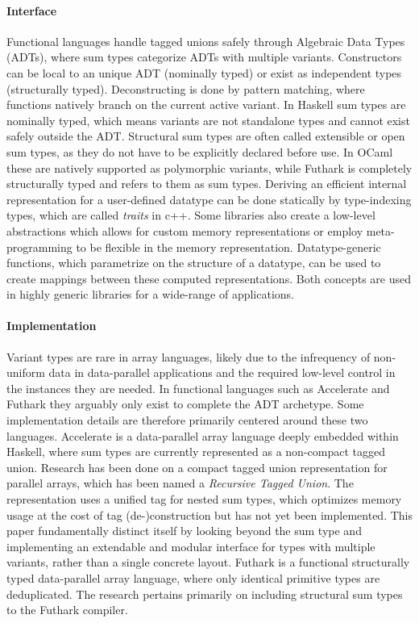 \documentclass{article}
\begin{document}
\paragraph{Interface}

Functional languages handle tagged unions safely through Algebraic Data Types (ADTs), where sum types categorize ADTs with multiple variants.
Constructors can be local to an unique ADT (nominally typed) or exist as independent types (structurally typed).
Deconstructing is done by pattern matching, where functions natively branch on the current active variant.
In Haskell sum types are nominally typed, which means variants are not standalone types and cannot exist safely outside the ADT.
Structural sum types are often called extensible or open sum types, as they do not have to be explicitly declared before use.
In OCaml these are natively supported as polymorphic variants, while Futhark is completely structurally typed and refers to them as sum types.
Deriving an efficient internal representation for a user-defined datatype can be done statically by type-indexing types\cite{associated-types}, which are called {\it traits} in c++.
Some libraries also create a low-level abstractions which allows for custom memory representations\cite{llama} or employ meta-programming to be flexible in the memory representation.
Datatype-generic functions, which parametrize on the structure of a datatype, can be used to create mappings between these computed representations.
Both concepts are used in highly generic libraries for a wide-range of applications\cite{generic-programming}. 

\paragraph{Implementation}

Variant types are rare in array languages, likely due to the infrequency of non-uniform data in data-parallel applications and the required low-level control in the instances they are needed.
In functional languages such as Accelerate and Futhark they arguably only exist to complete the ADT archetype.
Some implementation details are therefore primarily centered around these two languages.
Accelerate is a data-parallel array language deeply embedded within Haskell, where sum types are currently represented as a non-compact tagged union.
Research has been done on a compact tagged union representation for parallel arrays, which has been named a {\it Recursive Tagged Union}\cite{accelerate-sum-types}.
The representation uses a unified tag for nested sum types, which optimizes memory usage at the cost of tag (de-)construction but has not yet been implemented. 
This paper fundamentally distinct itself by looking beyond the sum type and implementing an extendable and modular interface for types with multiple variants, rather than a single concrete layout. 
Futhark is a functional structurally typed data-parallel array language, where only identical primitive types are deduplicated.
The research pertains primarily on including structural sum types to the Futhark compiler\cite{futhark-sum-types}.
\end{document}
